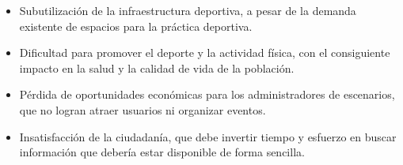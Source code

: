\begin{itemize}
  \item Subutilizaci\'on de la infraestructura deportiva, a pesar de la demanda
    existente de espacios para la pr\'actica deportiva.
  \item Dificultad para promover el deporte y la actividad f\'isica, con el
    consiguiente impacto en la salud y la calidad de vida de la poblaci\'on.
  \item P\'erdida de oportunidades econ\'omicas para los administradores de
    escenarios, que no logran atraer usuarios ni organizar eventos.
  \item Insatisfacci\'on de la ciudadan\'ia, que debe invertir tiempo y esfuerzo
    en buscar informaci\'on que deber\'ia estar disponible de forma sencilla.
\end{itemize}
